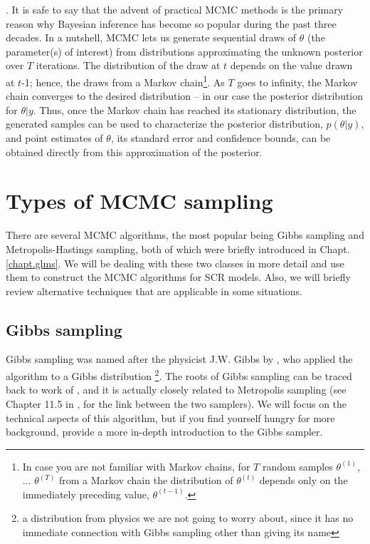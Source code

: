 \citep{gelfand_smith:1990}. It is safe to say that the advent of
practical MCMC methods is the primary reason why Bayesian inference
has become so popular during the past three decades.
In a nutshell, MCMC lets us generate sequential draws of $\theta$ (the
parameter(s) of interest) from distributions approximating the unknown
posterior over $T$ iterations. The distribution of the draw at $t$ depends
on the value drawn at $t$-1; hence, the draws from a Markov
chain\footnote{In case you are not familiar with Markov chains, for
  $T$ random samples $\theta^ {(1)}$, ... $\theta^{(T)}$ from a Markov chain
  the distribution of $\theta^{(t)}$ depends only on the immediately preceding
  value, $\theta^{(t-1)}$.}. As $T$ goes to infinity, the Markov chain
converges to the desired distribution – in our case the posterior
distribution for $\theta|y$. Thus, once the Markov chain has reached
its stationary distribution, the generated samples can be used to
characterize the posterior distribution, $p(\theta|y)$, and point
estimates of $\theta$, its standard error and confidence bounds, can
be obtained directly from this approximation of the posterior. 



\section{Types of MCMC sampling}

There are several MCMC algorithms, the most popular being Gibbs
sampling and Metropolis-Hastings sampling, both of which were briefly introduced in Chapt. \ref{chapt.glms}. We will be dealing with
these two classes in more detail and use them to construct the MCMC
algorithms for SCR models. Also, we will briefly review alternative
techniques that are applicable in some situations.


\subsection{Gibbs sampling}
\label{mcmc.sec.gibbs}

Gibbs sampling was named after the physicist J.W. Gibbs by
\citet{geman_geman:1984}, who applied the algorithm to a Gibbs
distribution \footnote{a distribution from physics we are not going to
  worry about, since it has no immediate connection with Gibbs
  sampling other than giving its name}. The roots of Gibbs sampling
can be traced back to work of \citet{metropolis_ulam:1953}, and it is
actually closely related to Metropolis sampling (see Chapter 11.5 in
\citet{gelman_etal:2004}, for the link between the two samplers). We
will focus on the technical aspects of this algorithm, but if you find
yourself hungry for more background, \citet{casella_george:1992}
provide a more in-depth introduction to the Gibbs sampler.

